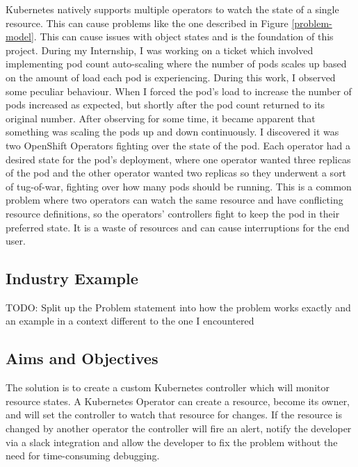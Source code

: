 \documentclass{article}
\begin{document}
Kubernetes natively supports multiple operators to watch the state of a single resource. This can 
cause problems like the one described in Figure \ref{problem-model}. This can cause issues 
with object states and is the foundation of this project. During my Internship, I was working 
on a ticket which involved implementing pod count auto-scaling where the number of pods scales 
up based on the amount of load each pod is experiencing. During this work, I observed some 
peculiar behaviour. When I forced the pod’s load to increase the number of pods increased as 
expected, but shortly after the pod count returned to its original number. After observing for 
some time, it became apparent that something was scaling the pods up and down continuously. 
I discovered it was two OpenShift Operators fighting over the state of the pod. Each operator 
had a desired state for the pod’s deployment, where one operator wanted three replicas of the 
pod and the other operator wanted two replicas so they underwent a sort of tug-of-war, fighting 
over how many pods should be running. This is a common problem where two operators can watch 
the same resource and have conflicting resource definitions, so the operators' controllers 
fight to keep the pod in their preferred state. It is a waste of resources and can cause interruptions 
for the end user.

\subsection{Industry Example}
TODO: Split up the Problem statement into how the problem works exactly and an example in a 
context different to the one I encountered

\subsection{Aims and Objectives}
The solution is to create a custom Kubernetes controller which will monitor resource states. 
A Kubernetes Operator can create a resource, become its owner, and will set the controller to 
watch that resource for changes. If the resource is changed by another operator the controller 
will fire an alert, notify the developer via a slack integration and allow the developer to 
fix the problem without the need for time-consuming debugging. 
\end{document}
